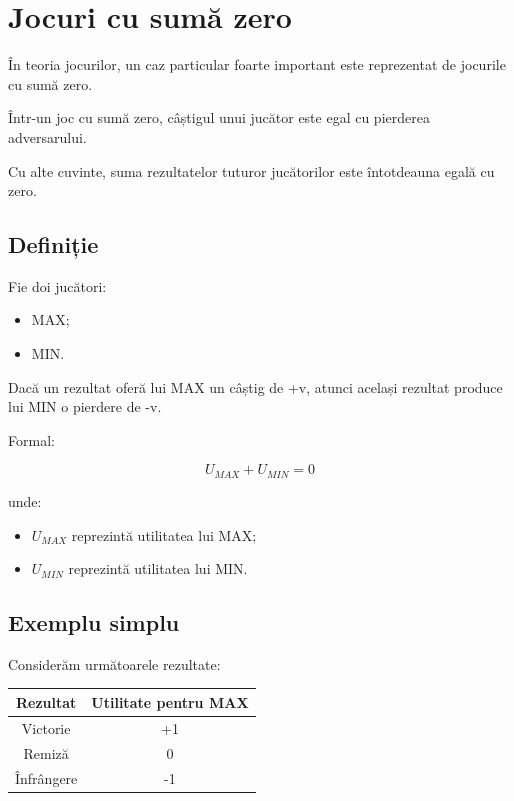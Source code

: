 \documentclass[12pt,a4paper]{article}
\begin{document}
\section{Jocuri cu sumă zero}

În teoria jocurilor, un caz particular foarte important este reprezentat de jocurile cu sumă zero.

Într-un joc cu sumă zero, câștigul unui jucător este egal cu pierderea adversarului.

Cu alte cuvinte, suma rezultatelor tuturor jucătorilor este întotdeauna egală cu zero.

\subsection{Definiție}

Fie doi jucători:

\begin{itemize}
\item MAX;
\item MIN.
\end{itemize}

Dacă un rezultat oferă lui MAX un câștig de +v, atunci același rezultat produce lui MIN o pierdere de -v.

Formal:

\[
U_{MAX} + U_{MIN} = 0
\]

unde:

\begin{itemize}
\item $U_{MAX}$ reprezintă utilitatea lui MAX;
\item $U_{MIN}$ reprezintă utilitatea lui MIN.
\end{itemize}

\subsection{Exemplu simplu}

Considerăm următoarele rezultate:

\begin{center}
\begin{tabular}{|c|c|}
\hline
Rezultat & Utilitate pentru MAX \\
\hline
Victorie & +1 \\
\hline
Remiză & 0 \\
\hline
Înfrângere & -1 \\
\hline
\end{tabular}
\end{center}
\end{document}
